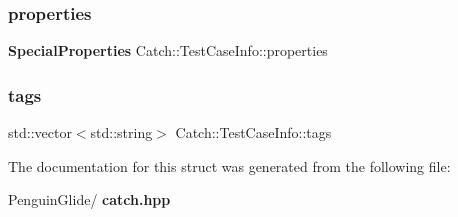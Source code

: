 \mbox{\label{struct_catch_1_1_test_case_info_afc1e84bd7a2e180895a06d9131302af0}} 
\subsubsection{properties}
{\footnotesize\ttfamily \textbf{ Special\+Properties} Catch\+::\+Test\+Case\+Info\+::properties}

\mbox{\label{struct_catch_1_1_test_case_info_a150a7cbca1dd0c91799ccb14ff822eb0}} 
\subsubsection{tags}
{\footnotesize\ttfamily std\+::vector$<$std\+::string$>$ Catch\+::\+Test\+Case\+Info\+::tags}



The documentation for this struct was generated from the following file\+:\begin{DoxyCompactItemize}
\item 
Penguin\+Glide/\textbf{ catch.\+hpp}\end{DoxyCompactItemize}
